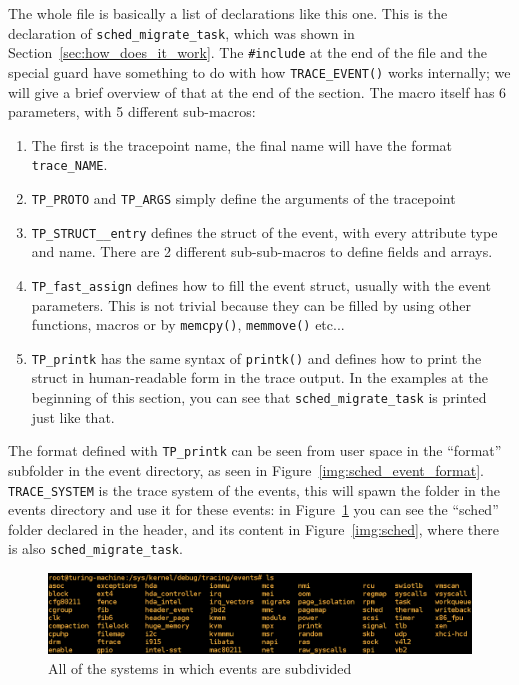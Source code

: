 The whole file is basically a list of declarations like this one. This is the declaration of \verb|sched_migrate_task|, which was shown in Section~\ref{sec:how_does_it_work}. The \verb|#include| at the end of the file and the special guard have something to do with how \verb|TRACE_EVENT()| works internally; we will give a brief overview of that at the end of the section. The macro itself has 6 parameters, with 5 different sub-macros:
\begin{enumerate}
    \item The first is the tracepoint name, the final name will have the format \verb|trace_NAME|.
    \item \verb|TP_PROTO| and \verb|TP_ARGS| simply define the arguments of the tracepoint
    \item \verb|TP_STRUCT__entry| defines the struct of the event, with every attribute type and name. There are 2 different sub-sub-macros to define fields and arrays.
    \item \verb|TP_fast_assign| defines how to fill the event struct, usually with the event parameters. This is not trivial because they can be filled by using other functions, macros or by \verb|memcpy()|, \verb|memmove()| etc...
    \item \verb|TP_printk| has the same syntax of \verb|printk()| and defines how to print the struct in human-readable form in the trace output. In the examples at the beginning of this section, you can see that \verb|sched_migrate_task| is printed just like that.
\end{enumerate}

The format defined with \verb|TP_printk| can be seen from user space in the ``format'' subfolder in the event directory, as seen in Figure~\ref{img:sched_event_format}. \verb|TRACE_SYSTEM| is the trace system of the events, this will spawn the folder in the events directory and use it for these events: in Figure~\ref{img:systems} you can see the ``sched'' folder declared in the header, and its content in Figure~\ref{img:sched}, where there is also \verb|sched_migrate_task|. 
\begin{figure}[ht]
  \centering
\includegraphics[width=.9\textwidth]{images/shell_trace_systems.png} 
\caption{All of the systems in which events are subdivided}
\label{img:systems}
\end{figure}

